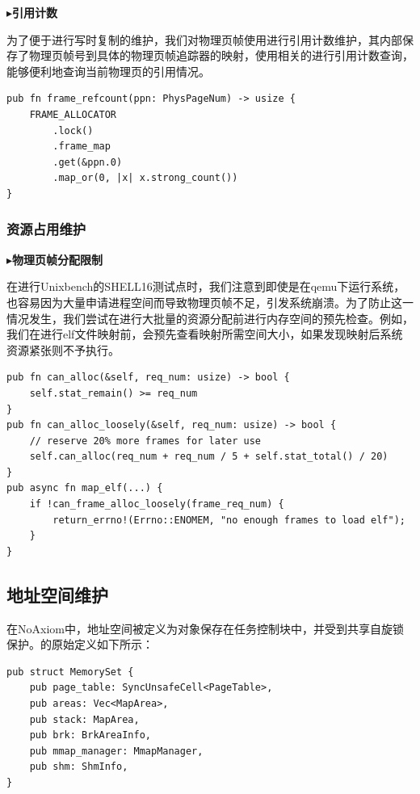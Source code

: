 \documentclass{article}
\begin{document}
$\blacktriangleright$\textbf{引用计数}

为了便于进行写时复制的维护，我们对物理页帧使用进行引用计数维护，其内部保存了物理页帧号到具体的物理页帧追踪器的映射，使用相关的进行引用计数查询，能够便利地查询当前物理页的引用情况。

\begin{lstlisting}
pub fn frame_refcount(ppn: PhysPageNum) -> usize {
    FRAME_ALLOCATOR
        .lock()
        .frame_map
        .get(&ppn.0)
        .map_or(0, |x| x.strong_count())
}
\end{lstlisting}

\subsubsection{资源占用维护}

$\blacktriangleright$\textbf{物理页帧分配限制}

在进行Unixbench的SHELL16测试点时，我们注意到即使是在qemu下运行系统，也容易因为大量申请进程空间而导致物理页帧不足，引发系统崩溃。为了防止这一情况发生，我们尝试在进行大批量的资源分配前进行内存空间的预先检查。例如，我们在进行elf文件映射前，会预先查看映射所需空间大小，如果发现映射后系统资源紧张则不予执行。

\begin{lstlisting}
pub fn can_alloc(&self, req_num: usize) -> bool {
    self.stat_remain() >= req_num
}
pub fn can_alloc_loosely(&self, req_num: usize) -> bool {
    // reserve 20% more frames for later use
    self.can_alloc(req_num + req_num / 5 + self.stat_total() / 20)
}
pub async fn map_elf(...) {
    if !can_frame_alloc_loosely(frame_req_num) {
        return_errno!(Errno::ENOMEM, "no enough frames to load elf");
    }
}
\end{lstlisting}

\subsection{地址空间维护}

在NoAxiom中，地址空间被定义为对象保存在任务控制块中，并受到共享自旋锁保护。的原始定义如下所示：

\begin{lstlisting}
pub struct MemorySet {
    pub page_table: SyncUnsafeCell<PageTable>,
    pub areas: Vec<MapArea>,
    pub stack: MapArea,
    pub brk: BrkAreaInfo,
    pub mmap_manager: MmapManager,
    pub shm: ShmInfo,
}
\end{lstlisting}
\end{document}
